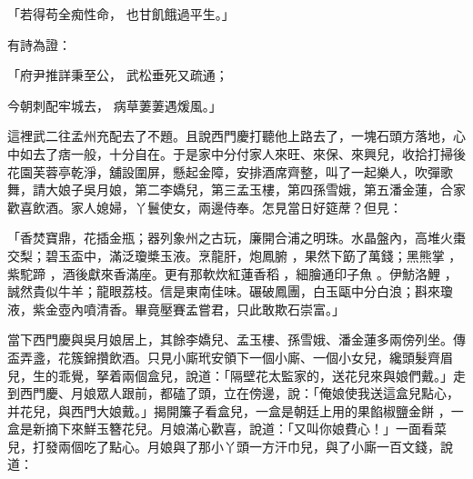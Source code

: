 \begin{showcontents}{}
「若得苟全痴性命，  也甘飢餓過平生。」

有詩為證：

「府尹推詳秉至公，  武松垂死又疏通；

今朝刺配牢城去，  病草萋萋遇煖風。」

這裡武二往孟州充配去了不題。且說西門慶打聽他上路去了，一塊石頭方落地，心中如去了痞一般，十分自在。于是家中分付家人來旺、來保、來興兒，收拾打掃後花園芙蓉亭乾淨，舖設圍屏，懸起金障，安排酒席齊整，叫了一起樂人，吹彈歌舞，請大娘子吳月娘，第二李嬌兒，第三孟玉樓，第四孫雪娥，第五潘金蓮，合家歡喜飲酒。家人媳婦，丫鬟使女，兩邊侍奉。怎見當日好筵蓆？但見：

「香焚寶鼎，花插金瓶；器列象州之古玩，廉開合浦之明珠。水晶盤內，高堆火棗交梨；碧玉盃中，滿泛瓊槳玉液。烹龍肝，炮鳳腑 ，果然下筯了萬錢；黑熊掌 ，紫駝蹄 ，酒後獻來香滿座。更有那軟炊紅蓮香稻 ，細膾通印子魚 。伊魴洛鯉 ，誠然貴似牛羊；龍眼荔枝。信是東南佳味。碾破鳳團，白玉甌中分白浪；斟來瓊液，紫金壺內噴清香。畢竟壓賽孟嘗君，只此敢欺石崇富。」

當下西門慶與吳月娘居上，其餘李嬌兒、孟玉樓、孫雪娥、潘金蓮多兩傍列坐。傳盃弄盞，花簇錦攢飲酒。只見小廝玳安領下一個小廝、一個小女兒，纔頭髮齊眉兒，生的乖覺，拏着兩個盒兒，說道：「隔壁花太監家的，送花兒來與娘們戴。」走到西門慶、月娘眾人跟前，都磕了頭，立在傍邊，說：「俺娘使我送這盒兒點心，并花兒，與西門大娘戴。」揭開簾子看盒兒，一盒是朝廷上用的果餡椒鹽金餅 ，一盒是新摘下來鮮玉簪花兒。月娘滿心歡喜，說道：「又叫你娘費心！」一面看菜兒，打發兩個吃了點心。月娘與了那小丫頭一方汗巾兒，與了小廝一百文錢，說道：


\end{showcontents}
